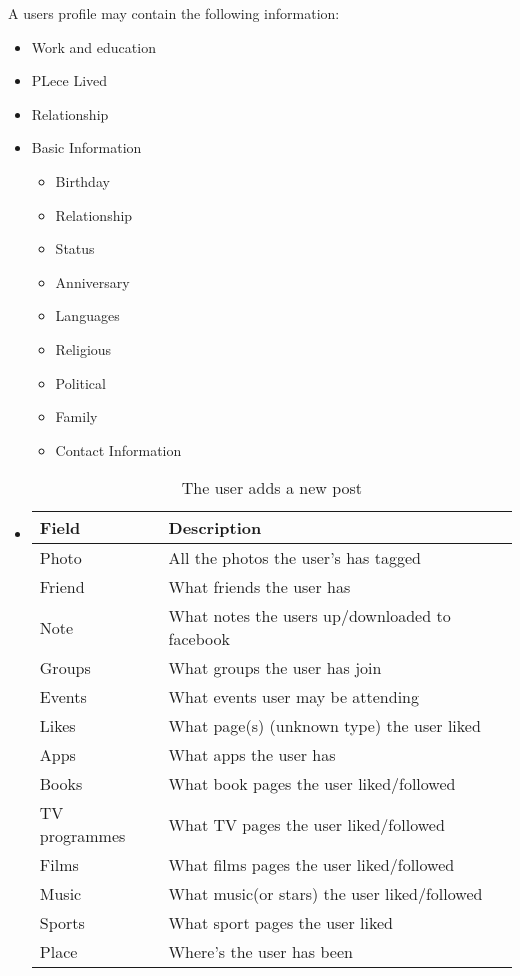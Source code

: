 A users profile may contain the following information:
\begin{itemize}
\item Work and education
\item PLece Lived
\item Relationship
\item Basic Information
    \begin{itemize}
        \item Birthday
        \item Relationship
        \item Status
        \item Anniversary
        \item Languages
        \item Religious
        \item Political
        \item Family
        \item Contact Information
    \end{itemize}

\item \begin{table}[h]
    \centering
    \begin{tabular}{ll}
    Field         & Description\\ \hline
    Photo         & All the photos the user's has tagged\\
    Friend        & What friends the user has\\
    Note          & What notes the users up/downloaded to facebook\\
    Groups        & What groups the user has join\\
    Events        & What events user may be attending\\
    Likes         & What page(s) (unknown type) the user liked\\
    Apps          & What apps the user has\\
    Books         & What book pages the user liked/followed\\
    TV programmes & What TV pages the user liked/followed\\
    Films         & What films pages the user liked/followed\\
    Music         & What music(or stars) the user liked/followed\\
    Sports        & What sport pages the user liked\\
    Place         & Where's the user has been\\
    \end{tabular}
    \caption{The user adds a new post}
    \end{table}
\end{itemize}

